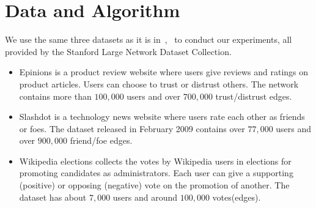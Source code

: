 \section{Data and Algorithm}
We use the same three datasets as it is
in~\cite{Leskovec:2010},~\cite{golbeck:distrust2011} to conduct our
experiments, all provided by the Stanford Large Network Dataset
Collection.
\begin{itemize}
\item Epinions is a product review website where users give reviews
  and ratings on product articles. Users can choose to trust or
  distrust others. The network contains more than $100,000$ users and
  over $700,000$ trust/distrust edges.
\item Slashdot is a technology news website where users rate each
  other as friends or foes. The dataset released in February 2009
  contains over $77,000$ users and over $900,000$ friend/foe edges.
\item Wikipedia elections collects the votes by Wikipedia users in
  elections for promoting candidates as administrators. Each user can
  give a supporting (positive) or opposing (negative) vote on the
  promotion of another. The dataset has about $7,000$ users and around
  $100,000$ votes(edges).
\end{itemize}

